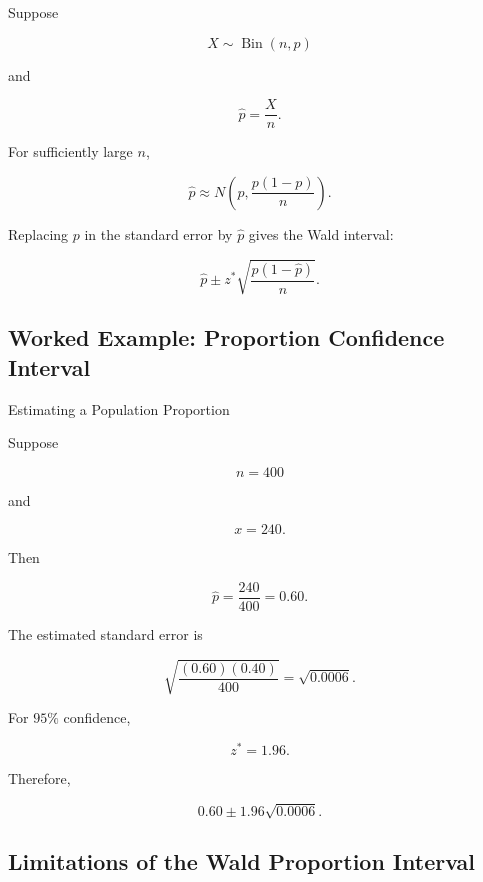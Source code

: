 Suppose

\[
X\sim\operatorname{Bin}(n,p)
\]

and

\[
\widehat{p}
=
\frac Xn.
\]

For sufficiently large \(n\),

\[
\widehat{p}
\approx
N
\left(
p,
\frac{
p(1-p)
}{n}
\right).
\]

Replacing \(p\) in the standard error by \(\widehat{p}\) gives the
Wald interval:

\[
\boxed{
\widehat{p}
\pm
z^*
\sqrt{
\frac{
\widehat{p}(1-\widehat{p})
}{n}
}.
}
\]

\subsection{Worked Example: Proportion Confidence Interval}
\label{subsec:worked-proportion-ci}

\begin{workedexamplebox}{Estimating a Population Proportion}

Suppose

\[
n=400
\]

and

\[
x=240.
\]

Then

\[
\widehat{p}
=
\frac{240}{400}
=
0.60.
\]

The estimated standard error is

\[
\sqrt{
\frac{
(0.60)(0.40)
}{400}
}
=
\sqrt{0.0006}.
\]

For \(95\%\) confidence,

\[
z^*=1.96.
\]

Therefore,

\begin{answerbox}
\[
\boxed{
0.60
\pm
1.96
\sqrt{0.0006}.
}
\]
\end{answerbox}

\end{workedexamplebox}

\subsection{Limitations of the Wald Proportion Interval}
\label{subsec:wald-proportion-limitations}

